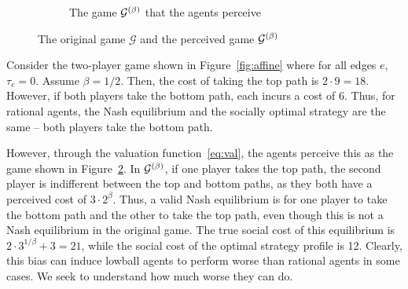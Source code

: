 \documentclass[twoside]{article}
\begin{document}
\begin{multicols}{2}
\begin{figure}[H]
\begin{subfigure}[b]{\linewidth}
    \caption{The game $\mathcal{G}^{(\beta)}$ that the agents perceive}
    \label{fig:affinebet}
  \end{subfigure}
  \caption{The original game $\mathcal{G}$ and the perceived game
  $\mathcal{G}^{(\beta)}$}
\end{figure}
Consider the two-player game shown in Figure~\ref{fig:affine} where for all edges $e$, $\tau_e = 0$. Assume $\beta =
1/2$. Then, the cost of taking the top path is $2 \cdot 9 = 18$. However, if
both players take the bottom path, each incurs a cost of 6. Thus, for rational
agents, the Nash equilibrium and the socially optimal strategy are the same --
both players take the bottom path.

However, through the valuation function~\eqref{eq:val}, the agents perceive this
as the game shown in Figure~\ref{fig:affinebet}. In $\mathcal{G}^{(\beta)}$, if one
player takes the top path, the second player is indifferent between the top and
bottom paths, as they both have a perceived cost of $3 \cdot 2^\beta$. Thus, a
valid Nash equilibrium is for one player to take the bottom path and the other
to take the top path, even though this is not a Nash equilibrium in the original
game. The true social cost of this equilibrium is $2 \cdot 3^{1/\beta} + 3 =
21$, while the social cost of the optimal strategy profile is 12. Clearly, this
bias can induce lowball agents to perform worse than rational agents in some
cases. We seek to understand how much worse they can do.

\end{multicols}
\end{document}
